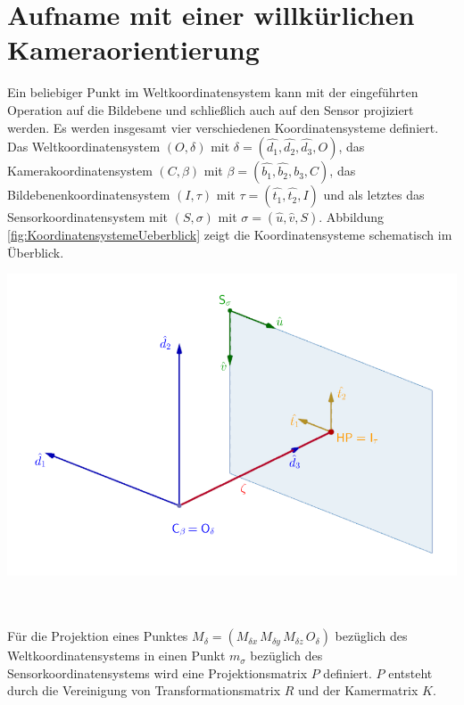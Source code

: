 \pagebreak


\section{Aufname mit einer willkürlichen Kameraorientierung}

Ein beliebiger Punkt im Weltkoordinatensystem kann mit der eingeführten Operation auf die Bildebene und schließlich auch auf den Sensor projiziert werden. Es werden insgesamt vier verschiedenen Koordinatensysteme definiert.
Das Weltkoordinatensystem $(O,\delta)$ mit $\delta =(\hat{d_1}, \hat{d_2},\hat{d_3},O)$, das Kamerakoordinatensystem $(C,\beta)$ mit $\beta = (\hat{b_1},\hat{b_2},\hat{b_3},C)$, das Bildebenenkoordinatensystem $(I,\tau)$ mit $\tau = (\hat{t_1},\hat{t_2},I)$ und als letztes das Sensorkoordinatensystem mit $(S,\sigma)$ mit $\sigma = (\hat{u},\hat{v},S)$. Abbildung \ref{fig:KoordinatensystemeUeberblick} zeigt die Koordinatensysteme schematisch im Überblick. 


\begin{minipage}{\linewidth}
	\centering
	\includegraphics[width=0.8\linewidth]{images/UebersichtKoordinatensysteme_beschriftet.png}
	\label{fig:KoordinatensystemeUeberblick}
\end{minipage}\\ \\ 

Für die Projektion eines Punktes $M_\delta=({M_{\delta x}}\,{M_{\delta y}}\,{M_{\delta z}}\,O_{\delta})$ bezüglich des Weltkoordinatensystems in einen Punkt $m_\sigma$ bezüglich des Sensorkoordinatensystems wird eine Projektionsmatrix $P$ definiert. $P$ entsteht durch die Vereinigung von Transformationsmatrix $R$ und der Kamermatrix $K$\cite{HZ}.\\


